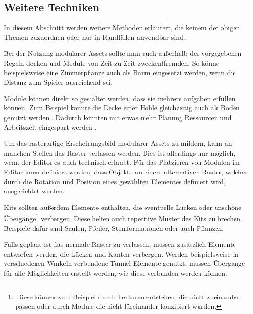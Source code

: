 \subsection{Weitere Techniken}\label{weitereT}
In diesem Abschnitt werden weitere Methoden erläutert, die keinem der obigen Themen zuzuordnen oder nur in Randfällen anwendbar sind.
\par
Bei der Nutzung modularer Assets sollte man  auch außerhalb der vorgegebenen Regeln denken und Module von Zeit zu Zeit zweckentfremden. So könne beispielsweise eine Zimmerpflanze auch als Baum eingesetzt werden, wenn die Distanz zum Spieler ausreichend sei. \parencite{unrealModular}
\par
Module können direkt so gestaltet werden, dass sie mehrere aufgaben erfüllen können. Zum Beispiel könnte die Decke einer Höhle gleichzeitig auch als Boden genutzt werden \parencite{Perry}. Dadurch könnten mit etwas mehr Planung Ressourcen und Arbeitszeit eingespart werden \parencite{unrealModular}.
\par
Um das rasterartige Erscheinungsbild modularer Assets zu mildern, kann an manchen Stellen das Raster verlassen werden. Dies ist allerdings nur möglich, wenn der Editor es auch technisch erlaubt. Für das Platzieren von Modulen im Editor kann definiert werden, dass Objekte an einem alternativen Raster, welches durch die Rotation und Position eines gewählten Elementes definiert wird, ausgerichtet werden. \parencite{Burgess}
\par
Kits sollten außerdem Elemente enthalten, die eventuelle Lücken oder unschöne Übergänge\footnote{\,Diese können zum Beispiel durch Texturen entstehen, die nicht zueinander passen oder durch Module die nicht füreinander konzipiert wurden.} verbergen. Diese helfen auch repetitive Muster des Kits zu brechen. Beispiele dafür sind Säulen, Pfeiler, Steinformationen oder auch Pflanzen. \parencite{Burgess,Perry}
\par
Falls geplant ist das normale Raster zu verlassen, müssen zusätzlich Elemente entworfen werden, die Lücken und Kanten verbergen. Werden beispielsweise in verschiedenen Winkeln verbundene Tunnel-Elemente genutzt, müssen Übergänge für alle Möglichkeiten erstellt werden, wie diese verbunden werden können. \parencite{Burgess}
\vspace{-10.5pt}
